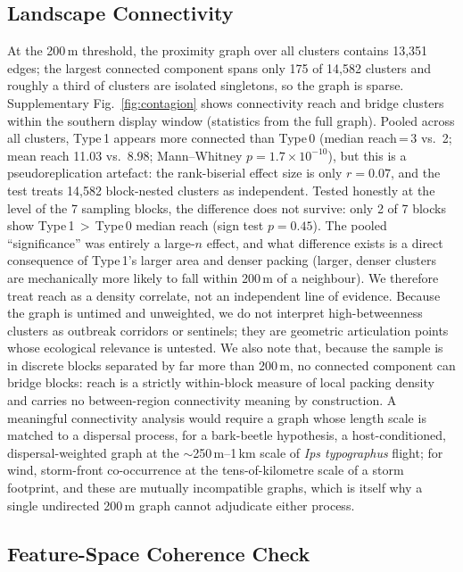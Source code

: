 \documentclass[twocolumn]{article}
\begin{document}
\subsection{Landscape Connectivity}
\label{sec:res-connectivity}

At the 200\,m threshold, the proximity graph over all clusters contains 13,351 edges; the largest
connected component spans only 175 of 14,582 clusters and roughly a third of clusters are
isolated singletons, so the graph is sparse. Supplementary Fig.~\ref{fig:contagion} shows connectivity
reach and bridge clusters within the southern display window (statistics from the full graph).
Pooled across all clusters, Type\,1 appears more connected than Type\,0 (median reach\,=\,3 vs.\ 2;
mean reach 11.03 vs.\ 8.98; Mann--Whitney $p = 1.7\times10^{-10}$), but this is a pseudoreplication
artefact: the rank-biserial effect size is only $r = 0.07$, and the test treats 14,582
block-nested clusters as independent. Tested honestly at the level of the 7 sampling blocks, the
difference does not survive: only 2 of 7 blocks show Type\,1\,$>$\,Type\,0 median reach (sign test
$p = 0.45$). The pooled ``significance'' was entirely a large-$n$ effect, and what difference exists
is a direct consequence of Type\,1's larger area and denser packing (larger, denser clusters are
mechanically more likely to fall within 200\,m of a neighbour). We therefore treat reach as a density correlate,
not an independent line of evidence. Because the graph is untimed and unweighted, we do not
interpret high-betweenness clusters as outbreak corridors or sentinels; they are geometric
articulation points whose ecological relevance is untested. We also note that, because the sample
is in discrete blocks separated by far more than 200\,m, no connected component can bridge blocks:
reach is a strictly within-block measure of local packing density and carries no between-region
connectivity meaning by construction. A meaningful connectivity analysis
would require a graph whose length scale is matched to a dispersal process, for a bark-beetle
hypothesis, a host-conditioned, dispersal-weighted graph at the $\sim$250\,m--1\,km scale of
\textit{Ips typographus} flight; for wind, storm-front co-occurrence at the tens-of-kilometre
scale of a storm footprint, and these are mutually incompatible graphs, which is itself why a
single undirected 200\,m graph cannot adjudicate either process.


\subsection{Feature-Space Coherence Check}
\label{sec:res-validation}
\end{document}
